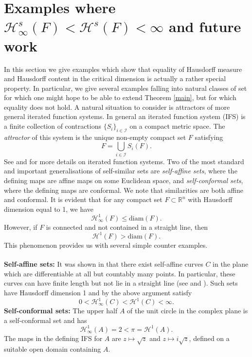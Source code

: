 \documentclass[11pt,english,british]{article}
\numberwithin{equation}{section}
\renewcommand{\leq}{\leqslant}
\begin{document}
\section{Examples where $\mathcal{H}_\infty^s (F) <  \mathcal{H}^s (F) < \infty$ and future work} \label{examples}

In this section we give examples which show that equality of Hausdorff measure and Hausdorff content in the critical dimension is actually a rather special property.  In particular, we give several examples falling into natural classes of set for which one might hope to be able to extend Theorem \ref{main}, but for which equality does not hold.  A natural situation to consider is attractors of more general iterated function systems. In general an iterated function system (IFS) is a finite collection of contractions $\{S_i\}_{i \in \mathcal{I}}$ on a compact metric space. The \emph{attractor} of this system is the unique non-empty compact set $F$ satisfying
\[
F = \bigcup_{i \in \mathcal{I}} S_i (F).
\]
See \cite[Chapter 9]{falconer} and \cite{hutchinson} for more details on iterated function systems.  Two of the most standard and important generalisations of self-similar sets are \emph{self-affine sets}, where the defining maps are affine maps on some Euclidean space, and \emph{self-conformal sets}, where the defining maps are conformal.  We note that similarities are both affine and conformal.  It is evident that for any compact set $F \subset \mathbb{R}^n$ with Hausdorff dimension equal to 1, we have
\[
\mathcal{H}_\infty^1(F) \leq \text{diam}( F ).
\]
However, if $F$ is connected and not contained in a straight line, then 
\[
\mathcal{H}^1(F) > \text{diam}(F ).
\]
This phenomenon provides us with several simple counter examples.
\\ \\
\textbf{Self-affine sets:}  It was shown in \cite{bandt} that there exist self-affine curves $C$ in the plane which are differentiable at all but countably many points. In particular, these curves can have finite length but not lie in a straight line (see \cite[Example 10]{bandt} and \cite[Example 6.2]{kaenmaki}).  Such sets have Hausdorff dimension 1 and by the above argument satisfy
\[
0 < \mathcal{H}_\infty^1 (C) <  \mathcal{H}^1 (C) < \infty.
\]
\textbf{Self-conformal sets:} The upper half $A$ of the unit circle in the complex plane is a self-conformal set and has
\[
\mathcal{H}_\infty^1 (A) = 2 <  \pi =  \mathcal{H}^1 (A).
\]
The maps in the defining IFS for $A$ are $z \mapsto \sqrt{z}$ and $z \mapsto i \sqrt{z}$, defined on a suitable open domain containing $A$.
\end{document}
